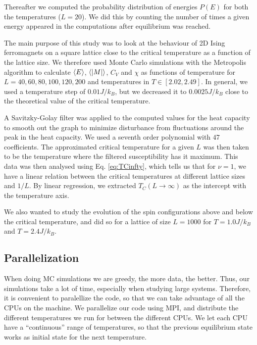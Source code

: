 \documentclass[%
 reprint,
nofootinbib,
aps,
]{revtex4-1}
\begin{document}
Thereafter we computed the probability distribution of energies $P(E)$ for both the temperatures ($L = 20$). We did this by counting the number of times a given energy appeared in the computations after equilibrium was reached. 

The main purpose of this study was to look at the behaviour of 2D Ising ferromagnets on a square lattice close to the critical temperature as a function of the lattice size. We therefore used Monte Carlo simulations with the Metropolis algorithm to calculate $\ev{E}$, $\ev{\abs{M}}$, $C_V$ and $\chi$ as functions of temperature for $L = 40, 60, 80, 100, 120, 200$ and temperatures in $T \in [2.02, 2.49]$. In general, we used a temperature step of $0.01J/k_B$, but we decreased it to $0.0025J/k_B$ close to the theoretical value of the critical temperature.

 A Savitzky-Golay filter was applied to the computed values for the heat capacity to smooth out the graph to minimize disturbance from fluctuations around the peak in the heat capacity. We used a seventh order polynomial with $47$ coefficients. The approximated critical temperature for a given $L$ was then taken to be the temperature where the filtered susceptibility has it maximum. This data was then analysed using Eq. \eqref{eq:TCinfty}, which tells us that for $\nu = 1$, we have a linear relation between the critical temperatures at different lattice sizes and $1/L$. By linear regression, we extracted $T_C(L\to\infty)$ as the intercept with the temperature axis.

We also wanted to study the evolution of the spin configurations above and below the critical temperature, and did so for a lattice of size $L = 1000$ for $T = 1.0J/k_B$ and $T = 2.4J/k_B$.


\subsection{Parallelization}

When doing MC simulations we are greedy, the more data, the better. Thus, our simulations take a lot of time, especially when studying large systems. Therefore, it is convenient to paralellize the code, so that we can take advantage of all the CPUs on the machine. We parallelize our code using MPI, and distribute the different temperatures we run for between the different CPUs. We let each CPU have a ``continuous'' range of temperatures, so that the previous equilibrium state works as initial state for the next temperature.
\end{document}
